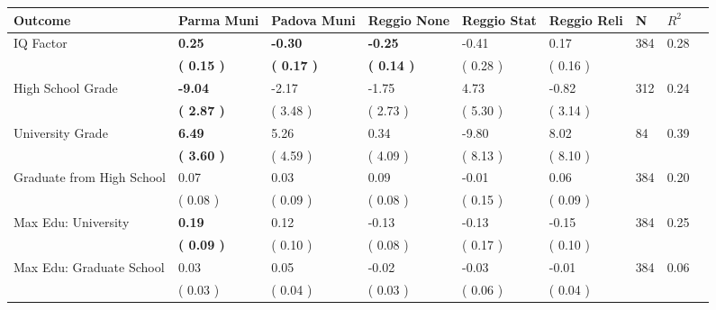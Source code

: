 \begin{tabular}{L{6.2cm} C{1.8cm} C{1.8cm} C{1.8cm} C{1.8cm} C{1.8cm} C{1.8cm} C{0.3cm} C{0.3cm}}
\toprule
 \textbf{Outcome} & \textbf{Parma Muni} & \textbf{Padova Muni} & \textbf{Reggio None} & \textbf{Reggio Stat} & \textbf{Reggio Reli} & \textbf{N} & \textbf{$ R^2$} \\
\midrule
IQ Factor & \textbf{     0.25} & \textbf{    -0.30} & \textbf{    -0.25} &     -0.41 &      0.17  & 384 &       0.28 \\ 
 & \textbf{(     0.15 )} & \textbf{(     0.17 )} & \textbf{(     0.14 )} & (     0.28 ) & (     0.16 )  & \\
High School Grade & \textbf{    -9.04} &     -2.17 &     -1.75 &      4.73 &     -0.82  & 312 &       0.24 \\ 
 & \textbf{(     2.87 )} & (     3.48 ) & (     2.73 ) & (     5.30 ) & (     3.14 )  & \\
University Grade & \textbf{     6.49} &      5.26 &      0.34 &     -9.80 &      8.02  & 84 &       0.39 \\ 
 & \textbf{(     3.60 )} & (     4.59 ) & (     4.09 ) & (     8.13 ) & (     8.10 )  & \\
Graduate from High School &      0.07 &      0.03 &      0.09 &     -0.01 &      0.06  & 384 &       0.20 \\ 
 & (     0.08 ) & (     0.09 ) & (     0.08 ) & (     0.15 ) & (     0.09 )  & \\
Max Edu: University & \textbf{     0.19} &      0.12 &     -0.13 &     -0.13 &     -0.15  & 384 &       0.25 \\ 
 & \textbf{(     0.09 )} & (     0.10 ) & (     0.08 ) & (     0.17 ) & (     0.10 )  & \\
Max Edu: Graduate School &      0.03 &      0.05 &     -0.02 &     -0.03 &     -0.01  & 384 &       0.06 \\ 
 & (     0.03 ) & (     0.04 ) & (     0.03 ) & (     0.06 ) & (     0.04 )  & \\
\bottomrule
\end{tabular}
